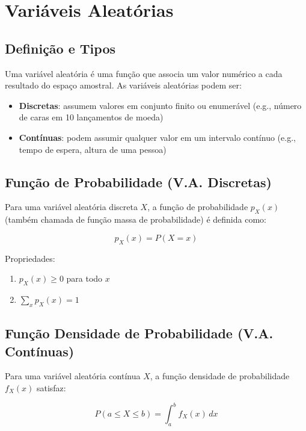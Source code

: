 \documentclass[a4paper,12pt]{article}
\begin{document}
\section{Variáveis Aleatórias}

\subsection{Definição e Tipos}

Uma variável aleatória é uma função que associa um valor numérico a cada resultado do espaço amostral. As variáveis aleatórias podem ser:

\begin{itemize}
    \item \textbf{Discretas}: assumem valores em conjunto finito ou enumerável (e.g., número de caras em 10 lançamentos de moeda)
    \item \textbf{Contínuas}: podem assumir qualquer valor em um intervalo contínuo (e.g., tempo de espera, altura de uma pessoa)
\end{itemize}

\subsection{Função de Probabilidade (V.A. Discretas)}

Para uma variável aleatória discreta $X$, a função de probabilidade $p_X(x)$ (também chamada de função massa de probabilidade) é definida como:

\begin{equation}
p_X(x) = P(X = x)
\end{equation}

Propriedades:
\begin{enumerate}[label=(\roman*)]
    \item $p_X(x) \geq 0$ para todo $x$
    \item $\sum_{x} p_X(x) = 1$
\end{enumerate}

\subsection{Função Densidade de Probabilidade (V.A. Contínuas)}

Para uma variável aleatória contínua $X$, a função densidade de probabilidade $f_X(x)$ satisfaz:

\begin{equation}
P(a \leq X \leq b) = \int_{a}^{b} f_X(x) \, dx
\end{equation}
\end{document}
